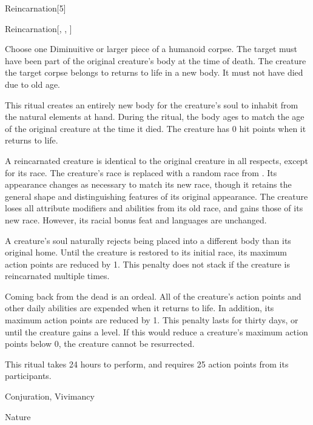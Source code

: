 \begin{spellsection}{Reincarnation}[5]


\begin{ability}{Reincarnation}[, , ]

Choose one Diminuitive or larger piece of a humanoid corpse.
The target must have been part of the original creature's body at the time of death.
The creature the target corpse belongs to returns to life in a new body.
It must not have died due to old age.

This ritual creates an entirely new body for the creature's soul to inhabit from the natural elements at hand.
During the ritual, the body ages to match the age of the original creature at the time it died.
The creature has 0 hit points when it returns to life.

A reincarnated creature is identical to the original creature in all respects, except for its race.
The creature's race is replaced with a random race from .
Its appearance changes as necessary to match its new race, though it retains the general shape and distinguishing features of its original appearance.
The creature loses all attribute modifiers and abilities from its old race, and gains those of its new race.
However, its racial bonus feat and languages are unchanged.

A creature's soul naturally rejects being placed into a different body than its original home.
Until the creature is restored to its initial race, its maximum action points are reduced by 1.
This penalty does not stack if the creature is reincarnated multiple times.

Coming back from the dead is an ordeal.
All of the creature's action points and other daily abilities are expended when it returns to life.
In addition, its maximum action points are reduced by 1.
This penalty lasts for thirty days, or until the creature gains a level.
If this would reduce a creature's maximum action points below 0, the creature cannot be resurrected.

This ritual takes 24 hours to perform, and requires 25 action points from its participants.

\end{ability}




 Conjuration, Vivimancy

 Nature
\end{spellsection}


